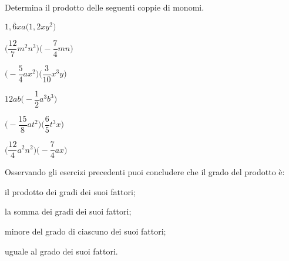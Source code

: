 \begin{esercizio}
 \label{ese:9.15}
Determina il prodotto delle seguenti coppie di monomi.
\begin{multicols}{3}
\begin{enumeratea}
 \item \(1,\overline{6}xa\big(1,2xy^{2}\big)\)
 \item \(\bigg(\dfrac{12}{7}m^{2}n^{3}\bigg)\bigg(-{\dfrac{7}{4}}mn\bigg)\)
 \item \(\bigg(-{\dfrac{5}{4}}ax^{2}\bigg)\bigg(\dfrac{3}{10}x^{3}y\bigg)\)
 \item \(12ab\bigg(-{\dfrac{1}{2}}a^{3}b^{3}\bigg)\)
 \item \(\bigg(-{\dfrac{15}{8}}at^{2}\bigg)\bigg(\dfrac{6}{5}t^{3}x\bigg)\)
 \item \(\bigg(\dfrac{12}{4}a^{2}n^{2}\bigg)\bigg(-{\dfrac{7}{4}}ax\bigg)\)
\end{enumeratea}
\end{multicols}
\end{esercizio}


\begin{esercizio}
 \label{ese:9.16}
Osservando gli esercizi precedenti puoi concludere che il grado del 
prodotto è:

\begin{enumeratea}
 \item il prodotto dei gradi dei suoi fattori;
 \item la somma dei gradi dei suoi fattori;
 \item minore del grado di ciascuno dei suoi fattori;
 \item uguale al grado dei suoi fattori.
\end{enumeratea}
\end{esercizio}

\newpage %

\subsubsection*{}

